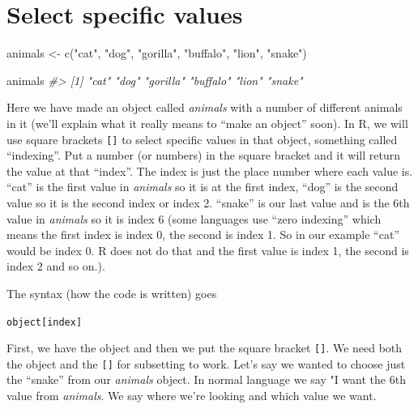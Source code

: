 \documentclass[
  12pt,
]{book}
\newenvironment{Shaded}{\begin{snugshade}}{\end{snugshade}}
\newcommand{\CommentTok}[1]{\textcolor[rgb]{0.37,0.37,0.37}{\textit{#1}}}
\newcommand{\FunctionTok}[1]{\textcolor[rgb]{0,0,0}{#1}}
\newcommand{\NormalTok}[1]{#1}
\newcommand{\OtherTok}[1]{\textcolor[rgb]{0.37,0.37,0.37}{#1}}
\newcommand{\StringTok}[1]{\textcolor[rgb]{0.5,0.5,0.5}{#1}}
\begin{document}
\hypertarget{select-specific-values}{%
\section{Select specific values}\label{select-specific-values}}

\begin{Shaded}
\begin{Highlighting}[]
\NormalTok{animals }\OtherTok{\textless{}{-}} \FunctionTok{c}\NormalTok{(}\StringTok{"cat"}\NormalTok{, }\StringTok{"dog"}\NormalTok{, }\StringTok{"gorilla"}\NormalTok{, }\StringTok{"buffalo"}\NormalTok{, }\StringTok{"lion"}\NormalTok{, }\StringTok{"snake"}\NormalTok{)}
\end{Highlighting}
\end{Shaded}

\begin{Shaded}
\begin{Highlighting}[]
\NormalTok{animals}
\CommentTok{\#\textgreater{} [1] "cat"     "dog"     "gorilla" "buffalo" "lion"    "snake"}
\end{Highlighting}
\end{Shaded}

Here we have made an object called \emph{animals} with a number of different animals in it (we'll explain what it really means to ``make an object'' soon). In R, we will use square brackets \texttt{{[}{]}} to select specific values in that object, something called ``indexing''. Put a number (or numbers) in the square bracket and it will return the value at that ``index''. The index is just the place number where each value is. ``cat'' is the first value in \emph{animals} so it is at the first index, ``dog'' is the second value so it is the second index or index 2. ``snake'' is our last value and is the 6th value in \emph{animals} so it is index 6 (some languages use ``zero indexing'' which means the first index is index 0, the second is index 1. So in our example ``cat'' would be index 0. R does not do that and the first value is index 1, the second is index 2 and so on.).

The syntax (how the code is written) goes

\texttt{object{[}index{]}}

First, we have the object and then we put the square bracket \texttt{{[}{]}}. We need both the object and the \texttt{{[}{]}} for subsetting to work. Let's say we wanted to choose just the ``snake'' from our \emph{animals} object. In normal language we say "I want the 6th value from \emph{animals}. We say where we're looking and which value we want.
\end{document}
